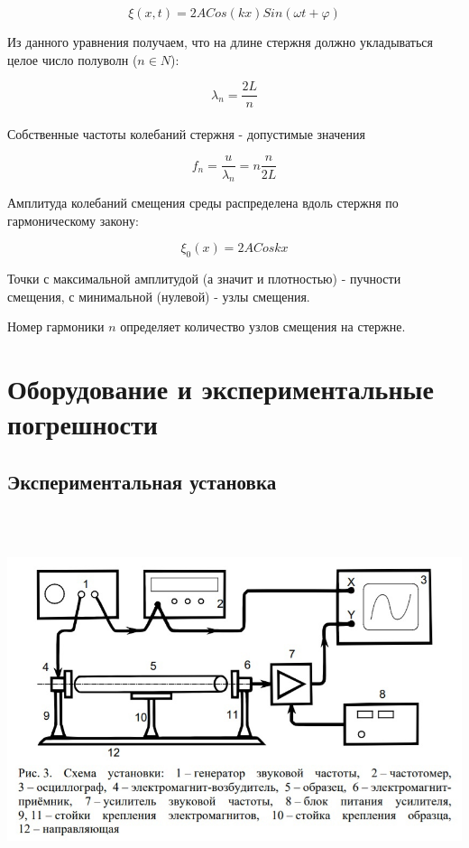 \begin{equation}
    \xi (x, t) = 2A Cos(kx)Sin(\omega t + \varphi)
\end{equation}

    Из данного уравнения получаем, что на длине стержня должно укладываться целое число полуволн ($n \in N$):

\[\lambda_n = \frac{2L}{n}\]\\



    Собственные частоты колебаний стержня - допустимые значения 

\[f_n = \frac{u}{\lambda_n} = n\frac{n}{2L}\]

    Амплитуда колебаний смещения среды распределена вдоль стержня по гармоническому закону:
    
\begin{equation}
    \xi_0(x) = 2A Coskx
\end{equation}
    
    
    
    Точки с максимальной амплитудой (а значит и плотностью) - пучности смещения, с минимальной (нулевой) - узлы смещения.

    Номер гармоники $n$ определяет количество узлов смещения на стержне.
    
    
    
    
    
\section{Оборудование и экспериментальные погрешности}
\subsection{Экспериментальная установка}


\begin{center}
\includegraphics[width=15cm, height=11cm]{ustanovka.jpeg}
\end{center}


